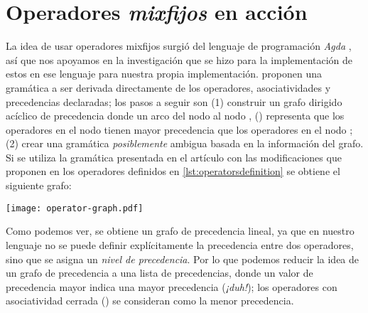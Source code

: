 {\begin{implementationfr}
\end{implementationfr}

\section{Operadores \emph{mixfijos} en acción}

\begin{investigationfr}
La idea de usar operadores mixfijos surgió del lenguaje de programación \emph{Agda} \cite{agda}, así que nos apoyamos en la investigación que se hizo para la implementación de estos en ese lenguaje para nuestra propia implementación. \textcite{parsing-mixfix-operators} proponen una gramática a ser derivada directamente de los operadores, asociatividades y precedencias declaradas; los pasos a seguir son (1) construir un grafo dirigido acíclico de precedencia donde un arco del nodo  al nodo , () representa que los operadores en el nodo  tienen mayor precedencia que los operadores en el nodo ; (2) crear una gramática \emph{posiblemente} ambigua basada en la información del grafo. Si se utiliza la gramática presentada en el artículo con las modificaciones que proponen en los operadores definidos en \ref{lst:operatorsdefinition} se obtiene el siguiente grafo:

\begin{center}
\texttt{[image: operator-graph.pdf]}
\label{fig:operator-graph}
\end{center}

Como podemos ver, se obtiene un grafo de precedencia lineal, ya que en nuestro lenguaje no se puede definir explícitamente la precedencia entre dos operadores, sino que se asigna un \emph{nivel de precedencia}. Por lo que podemos reducir la idea de un grafo de precedencia a una lista de precedencias, donde un valor de precedencia mayor indica una mayor precedencia (\emph{¡duh!}); los operadores con asociatividad cerrada () se consideran como la menor precedencia.

{   %
\newcommand{\overp}[1]{\overset{#1}{p}}
\renewcommand{\emph}[1]{\textbf{\textit{#1}}}
\renewcommand{\_}{\:\:}

}
\end{investigationfr}}
